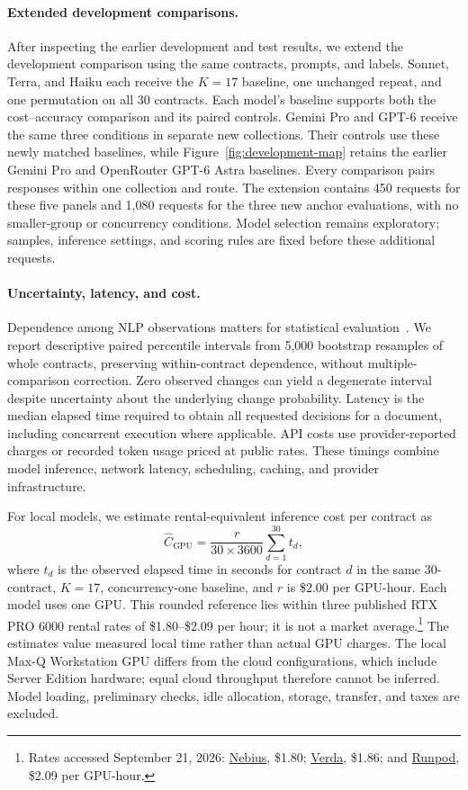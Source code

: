\paragraph{Extended development comparisons.}
After inspecting the earlier development and test results, we extend the development comparison using the same contracts, prompts, and labels. Sonnet, Terra, and Haiku each receive the $K=17$ baseline, one unchanged repeat, and one permutation on all 30 contracts. Each model's baseline supports both the cost--accuracy comparison and its paired controls. Gemini Pro and GPT-6 receive the same three conditions in separate new collections. Their controls use these newly matched baselines, while Figure~\ref{fig:development-map} retains the earlier Gemini Pro and OpenRouter GPT-6 Astra baselines. Every comparison pairs responses within one collection and route. The extension contains 450 requests for these five panels and 1,080 requests for the three new anchor evaluations, with no smaller-group or concurrency conditions. Model selection remains exploratory; samples, inference settings, and scoring rules are fixed before these additional requests.

\paragraph{Uncertainty, latency, and cost.}
Dependence among NLP observations matters for statistical evaluation~\citep{dror2018hitchhiker}. We report descriptive paired percentile intervals from 5,000 bootstrap resamples of whole contracts, preserving within-contract dependence, without multiple-comparison correction. Zero observed changes can yield a degenerate interval despite uncertainty about the underlying change probability. Latency is the median elapsed time required to obtain all requested decisions for a document, including concurrent execution where applicable. API costs use provider-reported charges or recorded token usage priced at public rates. These timings combine model inference, network latency, scheduling, caching, and provider infrastructure.

For local models, we estimate rental-equivalent inference cost per contract as
\begin{equation}
\widehat C_{\mathrm{GPU}} = \frac{r}{30\times3600}\sum_{d=1}^{30} t_d,
\end{equation}
where $t_d$ is the observed elapsed time in seconds for contract $d$ in the same 30-contract, $K=17$, concurrency-one baseline, and $r$ is \$2.00 per GPU-hour. Each model uses one GPU. This rounded reference lies within three published RTX PRO 6000 rental rates of \$1.80--\$2.09 per hour; it is not a market average.\footnote{Rates accessed September 21, 2026: \href{https://nebius.com/prices}{Nebius}, \$1.80; \href{https://verda.com/pricing}{Verda}, \$1.86; and \href{https://www.runpod.io/pricing}{Runpod}, \$2.09 per GPU-hour.} The estimates value measured local time rather than actual GPU charges. The local Max-Q Workstation GPU differs from the cloud configurations, which include Server Edition hardware; equal cloud throughput therefore cannot be inferred. Model loading, preliminary checks, idle allocation, storage, transfer, and taxes are excluded.


